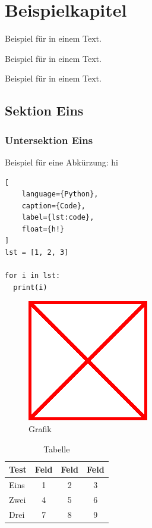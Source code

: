 \chapter{Beispielkapitel}
\label{chp:Beispielkapitel}

Beispiel für  in einem Text.

Beispiel für  in einem Text.

Beispiel für  in einem Text.

\section{Sektion Eins}
\label{sec:Sektion_Eins}

\blindtext

\subsection{Untersektion Eins}
\label{sub:Untersektion_Eins}

Beispiel für eine Abkürzung: \ac{hi}

\begin{lstlisting}[
	language={Python},
	caption={Code},
	label={lst:code},
	float={h!}
]
lst = [1, 2, 3]

for i in lst:
  print(i)
\end{lstlisting}

\begin{figure}[ht!]
	\centering
	\includegraphics[width=0.25\linewidth]{images/example-image.png}
	\caption{Grafik}
	\label{fig:grafik}
\end{figure}

\begin{table}[ht!]
	\selectfont
	\centering
	\begin{tabular}{l|ccc}
		Test & Feld & Feld & Feld \\
		\hline
		Eins & 1 & 2 & 3 \\
		Zwei & 4 & 5 & 6 \\
		Drei & 7 & 8 & 9 \\
	\end{tabular}
	\caption{Tabelle}
	\label{tab:tabelle}
\end{table}

